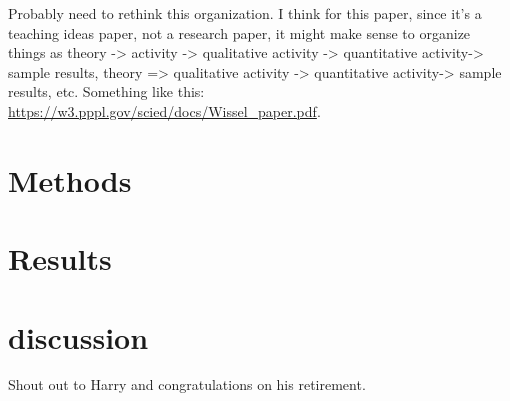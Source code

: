 \documentclass[%
reprint,
 amsmath,amssymb,
 aps,
prb,
floatfix,
longbibliography,
notitlepage
]{revtex4-1}
\newcommand{\DB}[1]{{\color{red}#1}} %
\begin{document}
\DB{Probably need to rethink this organization. I think for this paper, since it's a teaching ideas paper, not a research paper, it might make sense to organize things as theory -> activity -> qualitative activity -> quantitative activity-> sample results, theory => qualitative activity -> quantitative activity-> sample results, etc. Something like this: \url{https://w3.pppl.gov/scied/docs/Wissel_paper.pdf}.}

\section{Methods}\label{sec:methods}

\section{Results }\label{sec:results}

\section{ discussion } \label{sec:discussion}

\begin{acknowledgments}

\DB{Shout out to Harry and congratulations on his retirement.}

\end{acknowledgments}


\end{document}
